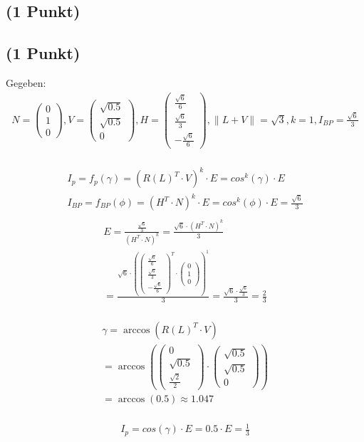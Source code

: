 \documentclass[a4paper,10pt,DIV=14]{article}
\begin{document}
\subsubsection{}

\subsection{(1 Punkt)}

\subsection{(1 Punkt)}%
\newcommand{\VecThree}[3]{\begin{pmatrix} #1 \\ #2 \\ #3 \end{pmatrix}}
Gegeben:
\begin{gather*}
N = \VecThree{0}{1}{0}, V = \VecThree{\sqrt{0.5}}{\sqrt{0.5}}{0}, H = \VecThree{\frac{\sqrt{6}}{6}}{\frac{\sqrt{6}}{3}}{-\frac{\sqrt{6}}{6}}, \lVert L+V \rVert = \sqrt{3}, k = 1, I_{BP} = \frac{\sqrt{6}}{3}
\end{gather*}
\\
\begin{gather*}
I_p = f_p(\gamma) = (R(L)^T \cdot V)^k \cdot E = cos^k(\gamma) \cdot E \\
I_{BP} = f_{BP}(\phi) = (H^T \cdot N)^k \cdot E = cos^k(\phi) \cdot E = \frac{\sqrt{6}}{3} \\
\end{gather*}
\begin{gather*}
E = \frac{\frac{\sqrt{6}}{3}}{(H^T \cdot N)^k} = \frac{\sqrt{6} \cdot (H^T \cdot N)^k}{3} \\
= \frac{\sqrt{6} \cdot \left(\VecThree{\frac{\sqrt{6}}{6}}{\frac{\sqrt{6}}{3}}{-\frac{\sqrt{6}}{6}}^T \cdot \VecThree{0}{1}{0}\right)^1}{3} = \frac{\sqrt{6} \cdot \frac{\sqrt{6}}{3}}{3} =  \frac{2}{3}
\end{gather*}
\\
\begin{gather*}
\gamma = \arccos(R(L)^T \cdot V) \\
= \arccos\left(\VecThree{0}{\sqrt{0.5}}{\frac{\sqrt{2}}{2}} \cdot \VecThree{\sqrt{0.5}}{\sqrt{0.5}}{0} \right) \\
= \arccos(0.5) \approx 1.047
\end{gather*}
\\
\begin{gather*}
I_p = cos(\gamma) \cdot E = 0.5 \cdot E = \frac{1}{3}
\end{gather*}
\end{document}

